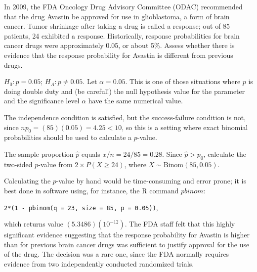 \begin{example}{In 2009, the FDA Oncology Drug Advisory Committee (ODAC) recommended that the drug Avastin be approved for use in glioblastoma, a form of brain cancer. Tumor shrinkage after taking a drug is called a response; out of 85 patients, 24 exhibited a response. Historically, response probabilities for brain cancer drugs were approximately 0.05, or about 5\%. Assess whether there is evidence that the response probability for Avastin is different from previous drugs. 		
}	

$H_0: p = 0.05$; $H_A: p \neq 0.05$. Let $\alpha = 0.05$. This is one of those situations where $p$ is doing double duty and (be careful!) the null hypothesis value for the parameter and the significance level $\alpha$ have the same numerical value. 

The independence condition is satisfied, but the success-failure condition is not, since $np_0 = (85)(0.05) = 4.25 < 10$, so this is a setting where exact binomial probabilities should be used to calculate a $p$-value.

The sample proportion $\hat{p}$ equals $x/n = 24/85 = 0.28$. Since $\hat{p} > p_0$, calculate the two-sided $p$-value from $2 \times P(X \geq 24)$, where $X \sim \text{Binom}(85, 0.05)$.

Calculating the $p$-value by hand would be time-consuming and error prone; it is best done in software using, for instance, the R command $pbinom$:

\texttt{2*(1 - pbinom(q = 23, size = 85, p = 0.05))},

which returns value $(5.3486)(10^{-12})$.  The FDA staff felt that this highly significant evidence suggesting that the response probability for Avastin is higher than for previous brain cancer drugs was sufficient to justify approval for the use of the drug.  The decision was a rare one, since the FDA normally requires evidence from two independently conducted randomized trials. 
	
\end{example}

